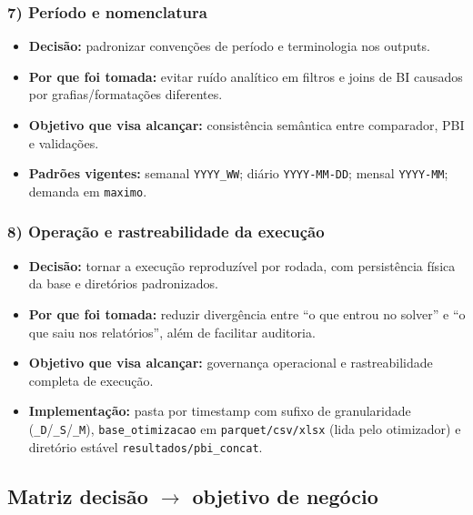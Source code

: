 \documentclass[11pt,a4paper]{article}
\begin{document}
\subsubsection*{7) Período e nomenclatura}
\begin{itemize}
    \item \textbf{Decisão:} padronizar convenções de período e terminologia nos
    outputs.
    \item \textbf{Por que foi tomada:} evitar ruído analítico em filtros e
    joins de BI causados por grafias/formatações diferentes.
    \item \textbf{Objetivo que visa alcançar:} consistência semântica entre
    comparador, PBI e validações.
    \item \textbf{Padrões vigentes:} semanal \texttt{YYYY\_WW}; diário
    \texttt{YYYY-MM-DD}; mensal \texttt{YYYY-MM}; demanda em \texttt{maximo}.
\end{itemize}

\subsubsection*{8) Operação e rastreabilidade da execução}
\begin{itemize}
    \item \textbf{Decisão:} tornar a execução reproduzível por rodada, com
    persistência física da base e diretórios padronizados.
    \item \textbf{Por que foi tomada:} reduzir divergência entre ``o que entrou
    no solver'' e ``o que saiu nos relatórios'', além de facilitar auditoria.
    \item \textbf{Objetivo que visa alcançar:} governança operacional e
    rastreabilidade completa de execução.
    \item \textbf{Implementação:} pasta por timestamp com sufixo de granularidade
    (\texttt{\_D}/\texttt{\_S}/\texttt{\_M}), \texttt{base\_otimizacao}
    em \texttt{parquet/csv/xlsx} (lida pelo otimizador) e diretório estável
    \texttt{resultados/pbi\_concat}.
\end{itemize}

\subsection{Matriz decisão $\rightarrow$ objetivo de negócio}
\end{document}
